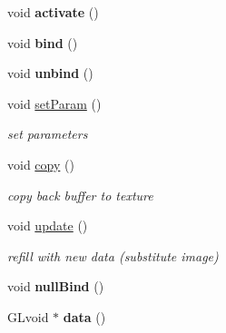 \begin{DoxyCompactItemize}
\item 
\hypertarget{classvsr_1_1_texture_af9450e056fca3c1429d1a150a77af1da}{void {\bfseries activate} ()}\label{classvsr_1_1_texture_af9450e056fca3c1429d1a150a77af1da}

\item 
\hypertarget{classvsr_1_1_texture_a666735a1c213b11ca2e0a2a3f484328f}{void {\bfseries bind} ()}\label{classvsr_1_1_texture_a666735a1c213b11ca2e0a2a3f484328f}

\item 
\hypertarget{classvsr_1_1_texture_a30298527100c1b76ba3149607b918445}{void {\bfseries unbind} ()}\label{classvsr_1_1_texture_a30298527100c1b76ba3149607b918445}

\item 
\hypertarget{classvsr_1_1_texture_a057a1ace29dbe2a3bb360fd40ce39a26}{void \hyperlink{classvsr_1_1_texture_a057a1ace29dbe2a3bb360fd40ce39a26}{set\-Param} ()}\label{classvsr_1_1_texture_a057a1ace29dbe2a3bb360fd40ce39a26}

\begin{DoxyCompactList}\small\item\em set parameters \end{DoxyCompactList}\item 
\hypertarget{classvsr_1_1_texture_aa494722294cd8ba714a16317ba4d8a71}{void \hyperlink{classvsr_1_1_texture_aa494722294cd8ba714a16317ba4d8a71}{copy} ()}\label{classvsr_1_1_texture_aa494722294cd8ba714a16317ba4d8a71}

\begin{DoxyCompactList}\small\item\em copy back buffer to texture \end{DoxyCompactList}\item 
\hypertarget{classvsr_1_1_texture_ae2d61173c4eee877c91dbc80c3590ad3}{void \hyperlink{classvsr_1_1_texture_ae2d61173c4eee877c91dbc80c3590ad3}{update} ()}\label{classvsr_1_1_texture_ae2d61173c4eee877c91dbc80c3590ad3}

\begin{DoxyCompactList}\small\item\em refill with new data (substitute image) \end{DoxyCompactList}\item 
\hypertarget{classvsr_1_1_texture_afb399482b9844043198b6c81c1c49f02}{void {\bfseries null\-Bind} ()}\label{classvsr_1_1_texture_afb399482b9844043198b6c81c1c49f02}

\item 
\hypertarget{classvsr_1_1_texture_a838326f3e9f629ef54117d35f252c35c}{G\-Lvoid $\ast$ {\bfseries data} ()}\label{classvsr_1_1_texture_a838326f3e9f629ef54117d35f252c35c}


\end{DoxyCompactItemize}

